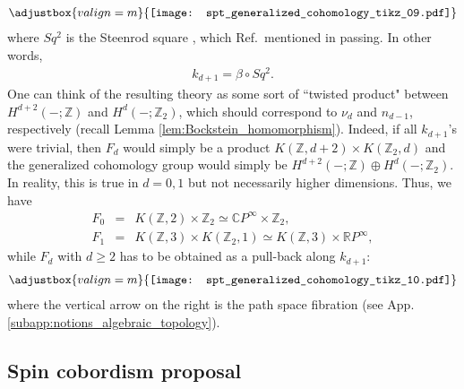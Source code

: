 \documentclass[sort&compress]{elsarticle}
\theoremstyle{theoremstyle}
\theoremstyle{framedtheoremstyle}
\theoremstyle{definitionstyle}
\theoremstyle{definitionstyle}
\theoremstyle{definitionstyle}
\theoremstyle{definitionstyle}
\theoremstyle{nameddefinitionstyle}
\theoremstyle{framednameddefinitionstyle}
\theoremstyle{proofstyle}
\theoremstyle{definitionstyle}
\newcommand{\ZZZ}{\mathbb{Z}}
\newcommand{\RRR}{\mathbb{R}}
\newcommand{\CCC}{\mathbb{C}}
\newcommand{\homotopic}{\simeq}
\newcommand{\paren}[1]{\left( #1 \right)}
\begin{document}
\begin{appendices}
\begin{eqnarray}
\adjustbox{valign=m}{\texttt{[image: spt\_generalized\_cohomology\_tikz\_09.pdf]}}
\end{eqnarray}
where $Sq^2$ is the Steenrod square \cite{Hatcher}, which Ref.\,\cite{Wen_Boson} mentioned in passing.
In other words,
\begin{eqnarray}
k_{d+1} = \beta \circ Sq^2.
\end{eqnarray}
One can think of the resulting theory as some sort of ``twisted product" between $H^{d+2}\paren{-;\ZZZ}$ and $H^d\paren{-;\ZZZ_2}$, which should correspond to $\nu_d$ and $n_{d-1}$, respectively (recall Lemma \ref{lem:Bockstein_homomorphism}). Indeed, if all $k_{d+1}$'s were trivial, then $F_d$ would simply be a product $K(\ZZZ,d+2) \times K(\ZZZ_2, d)$ and the generalized cohomology group would simply be $H^{d+2}\paren{-;\ZZZ} \oplus H^d\paren{-;\ZZZ_2}$. In reality, this is true in $d=0,1$ but not necessarily higher dimensions. Thus, we have
\begin{eqnarray}
F_0 &=& K(\ZZZ,2) \times \ZZZ_2 \homotopic \CCC P^\infty \times \ZZZ_2, \\
F_1 &=& K(\ZZZ,3) \times K(\ZZZ_2, 1) \homotopic K(\ZZZ,3) \times \RRR P^\infty,
\end{eqnarray}
while $F_d$ with $d\geq 2$ has to be obtained as a pull-back along $k_{d+1}$:
\begin{eqnarray}
\adjustbox{valign=m}{\texttt{[image: spt\_generalized\_cohomology\_tikz\_10.pdf]}}
\end{eqnarray}
where the vertical arrow on the right is the path space fibration (see App.\,\ref{subapp:notions_algebraic_topology}).





\subsection{Spin cobordism proposal \label{subapp:spin_cobordism_proposal}}


\end{appendices}
\end{document}
